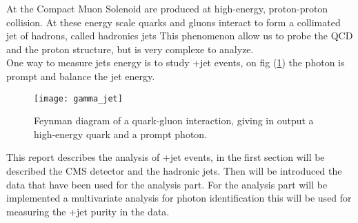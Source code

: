 
At the Compact Muon Solenoid are produced at high-energy, proton-proton collision. At these energy scale quarks and
gluons interact to form a collimated jet of hadrons, called hadronics jets
This phenomenon allow us to probe the QCD and the proton structure, but is very complexe to analyze.\\
One way to measure jets energy is to study \textgamma+jet events, on fig (\ref{gamma_jet}) the photon is prompt and balance the jet energy.

\begin{figure}[h!]
  \centering
  \texttt{[image: gamma\_jet]}\\[1cm]
  \caption{Feynman diagram of a quark-gluon interaction, giving in output a high-energy quark and a prompt photon.}
  \label{gamma_jet}
\end{figure}

This report describes the analysis of \textgamma+jet events, in the first section will be described the CMS detector and
the hadronic jets. Then will be introduced the data that have been used for the analysis part.
For the analysis part will be implemented a multivariate analysis for photon identification this will be used for
measuring the \textgamma+jet purity in the data.

